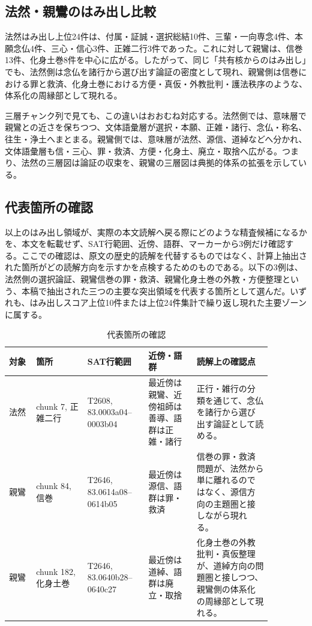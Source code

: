 \documentclass[uplatex,dvipdfmx,11pt,a4paper]{jsarticle}
\begin{document}
\subsection{法然・親鸞のはみ出し比較}

法然はみ出し上位24件は、付属・証誠・選択総結10件、三輩・一向専念4件、本願念仏4件、三心・信心3件、正雑二行3件であった。これに対して親鸞は、信巻13件、化身土巻8件を中心に広がる。したがって、同じ「共有核からのはみ出し」でも、法然側は念仏を諸行から選び出す論証の密度として現れ、親鸞側は信巻における罪と救済、化身土巻における方便・真仮・外教批判・護法秩序のような、体系化の周縁部として現れる。

三層チャンク列で見ても、この違いはおおむね対応する。法然側では、意味層で親鸞との近さを保ちつつ、文体語彙層が選択・本願、正雑・諸行、念仏・称名、往生・浄土へまとまる。親鸞側では、意味層が法然、源信、道綽などへ分かれ、文体語彙層も信・三心、罪・救済、方便・化身土、廃立・取捨へ広がる。つまり、法然の三層図は論証の収束を、親鸞の三層図は典拠的体系の拡張を示している。

\subsection{代表箇所の確認}

以上のはみ出し領域が、実際の本文読解へ戻る際にどのような精査候補になるかを、本文を転載せず、SAT行範囲、近傍、語群、マーカーから3例だけ確認する。ここでの確認は、原文の歴史的読解を代替するものではなく、計算上抽出された箇所がどの読解方向を示すかを点検するためのものである。以下の3例は、法然側の選択論証、親鸞信巻の罪・救済、親鸞化身土巻の外教・方便整理という、本稿で抽出された三つの主要な突出領域を代表する箇所として選んだ。いずれも、はみ出しスコア上位10件または上位24件集計で繰り返し現れた主要ゾーンに属する。

\begin{table}[H]
\centering
\footnotesize
\setlength{\tabcolsep}{2pt}
\caption{代表箇所の確認}
\label{tab:case-study-chunks}
\begin{tabular}{@{}p{0.09\linewidth}p{0.17\linewidth}p{0.20\linewidth}p{0.16\linewidth}p{0.25\linewidth}@{}}
\toprule
対象 & 箇所 & SAT行範囲 & 近傍・語群 & 読解上の確認点 \\
\midrule
法然 & chunk 7, 正雑二行 & T2608, 83.0003a04--0003b04 & 最近傍は親鸞、近傍祖師は善導、語群は正雑・諸行 & 正行・雑行の分類を通じて、念仏を諸行から選び出す論証として読める。 \\
親鸞 & chunk 84, 信巻 & T2646, 83.0614a08--0614b05 & 最近傍は源信、語群は罪・救済 & 信巻の罪・救済問題が、法然から単に離れるのではなく、源信方向の主題圏と接しながら現れる。 \\
親鸞 & chunk 182, 化身土巻 & T2646, 83.0640b28--0640c27 & 最近傍は道綽、語群は廃立・取捨 & 化身土巻の外教批判・真仮整理が、道綽方向の問題圏と接しつつ、親鸞側の体系化の周縁部として現れる。 \\
\bottomrule
\end{tabular}
\end{table}
\end{document}

